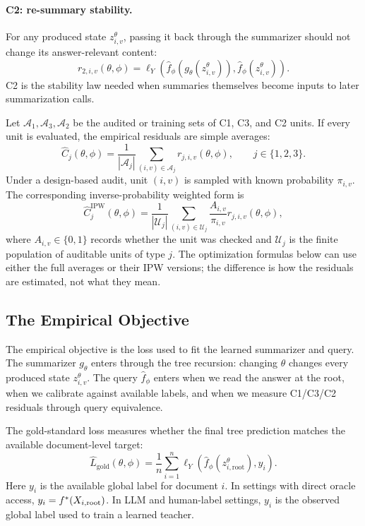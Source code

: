 \paragraph{C2: re-summary stability.}
For any produced state \(z_{i,v}^{\theta}\), passing it back through
the summarizer should not change its answer-relevant content:
\[
  r_{2,i,v}(\theta,\phi)
  =
  \ell_Y\!\left(
    \widehat f_\phi(g_\theta(z_{i,v}^{\theta})),
    \widehat f_\phi(z_{i,v}^{\theta})
  \right).
\]
C2 is the stability law needed when summaries themselves become inputs
to later summarization calls.

Let \(\mathcal A_1,\mathcal A_3,\mathcal A_2\) be the audited or
training sets of C1, C3, and C2 units. If every unit is evaluated, the
empirical residuals are simple averages:
\[
  \widehat C_j(\theta,\phi)
  =
  \frac{1}{|\mathcal A_j|}
  \sum_{(i,v)\in\mathcal A_j}r_{j,i,v}(\theta,\phi),
  \qquad j\in\{1,2,3\}.
\]
Under a design-based audit, unit \((i,v)\) is sampled with known
probability \(\pi_{i,v}\). The corresponding inverse-probability
weighted form is
\[
  \widehat C_j^{\mathrm{IPW}}(\theta,\phi)
  =
  \frac{1}{|\mathcal U_j|}
  \sum_{(i,v)\in\mathcal U_j}
  \frac{A_{i,v}}{\pi_{i,v}}
  r_{j,i,v}(\theta,\phi),
\]
where \(A_{i,v}\in\{0,1\}\) records whether the unit was checked and
\(\mathcal U_j\) is the finite population of auditable units of type
\(j\). The optimization formulas below can use either the full
averages or their IPW versions; the difference is how the residuals are
estimated, not what they mean.

\subsection{The Empirical Objective}
\label{app:v7-training-objective}

The empirical objective is the loss used to fit the learned summarizer
and query. The summarizer \(g_\theta\) enters through the tree
recursion: changing \(\theta\) changes every produced state
\(z_{i,v}^{\theta}\). The query \(\widehat f_\phi\) enters when
we read the answer at the root, when we calibrate against available labels, and
when we measure C1/C3/C2 residuals through query equivalence.

The gold-standard loss measures whether the final tree prediction
matches the available document-level target:
\[
  \widehat L_{\mathrm{gold}}(\theta,\phi)
  =
  \frac{1}{n}
  \sum_{i=1}^n
  \ell_Y\!\left(
    \widehat f_\phi(z_{i,\mathrm{root}}^{\theta}),
    y_i
  \right).
\]
Here \(y_i\) is the available global label for document \(i\). In
settings with direct oracle access, \(y_i=f^\ast(X_{i,\mathrm{root}})\).
In LLM and human-label settings, \(y_i\) is the observed global label
used to train a learned teacher.

